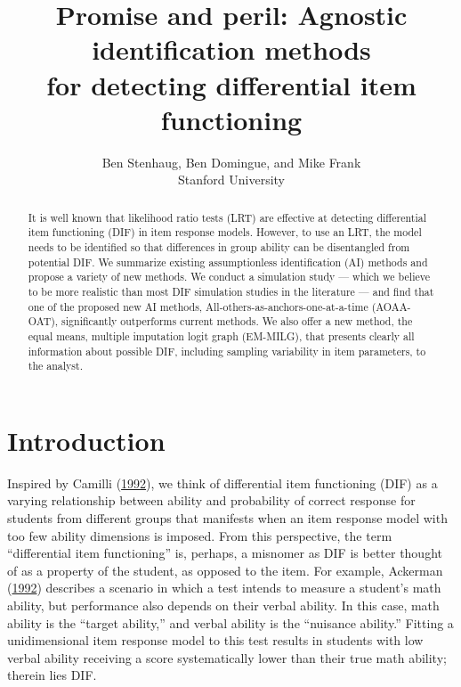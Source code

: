 \documentclass[
  11pt,
]{article}
\title{Promise and peril: Agnostic identification methods\\
for detecting differential item functioning}
\subtitle{Ben Stenhaug, Ben Domingue, and Mike Frank\\
Stanford University}
\author{}
\date{\vspace{-2.5em}}
\begin{document}
\maketitle
\begin{abstract}
It is well known that likelihood ratio tests (LRT) are effective at detecting differential item functioning (DIF) in item response models. However, to use an LRT, the model needs to be identified so that differences in group ability can be disentangled from potential DIF. We summarize existing assumptionless identification (AI) methods and propose a variety of new methods. We conduct a simulation study --- which we believe to be more realistic than most DIF simulation studies in the literature --- and find that one of the proposed new AI methods, All-others-as-anchors-one-at-a-time (AOAA-OAT), significantly outperforms current methods. We also offer a new method, the equal means, multiple imputation logit graph (EM-MILG), that presents clearly all information about possible DIF, including sampling variability in item parameters, to the analyst. \clearpage
\end{abstract}

{
\setcounter{tocdepth}{5}
\tableofcontents
}
\clearpage

\hypertarget{intro}{%
\section{Introduction}\label{intro}}

Inspired by Camilli (\protect\hyperlink{ref-camilli1992conceptual}{1992}), we think of differential item functioning (DIF) as a varying relationship between ability and probability of correct response for students from different groups that manifests when an item response model with too few ability dimensions is imposed. From this perspective, the term \enquote{differential item functioning} is, perhaps, a misnomer as DIF is better thought of as a property of the student, as opposed to the item. For example, Ackerman (\protect\hyperlink{ref-ackerman1992didactic}{1992}) describes a scenario in which a test intends to measure a student's math ability, but performance also depends on their verbal ability. In this case, math ability is the \enquote{target ability,} and verbal ability is the \enquote{nuisance ability.} Fitting a unidimensional item response model to this test results in students with low verbal ability receiving a score systematically lower than their true math ability; therein lies DIF.
\end{document}
